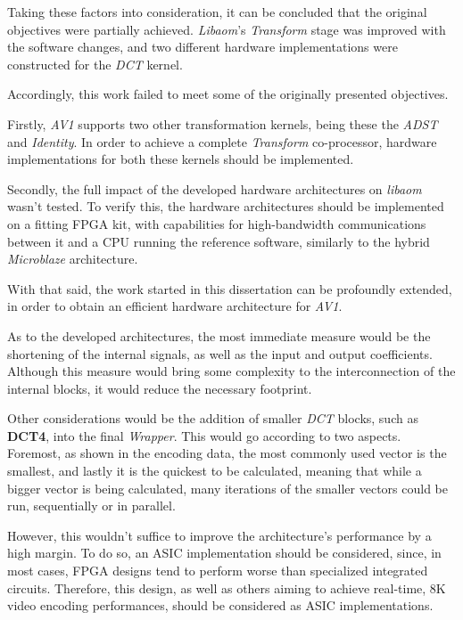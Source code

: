 Taking these factors into consideration, it can be concluded that the original objectives were partially achieved. \emph{Libaom}'s \emph{Transform} stage was improved with the software changes, and two different hardware implementations were constructed for the \emph{DCT} kernel. 

Accordingly, this work failed to meet some of the originally presented objectives.

Firstly, \emph{AV1} supports two other transformation kernels, being these the \emph{ADST} and \emph{Identity}. In order to achieve a complete \emph{Transform} co-processor, hardware implementations for both these kernels should be implemented.

Secondly, the full impact of the developed hardware architectures on \emph{libaom} wasn't tested. To verify this, the hardware architectures should be implemented on a fitting FPGA kit, with capabilities for high-bandwidth communications between it and a CPU running the reference software, similarly to the hybrid \emph{Microblaze} architecture.

With that said, the work started in this dissertation can be profoundly extended, in order to obtain an efficient hardware architecture for \emph{AV1}.

As to the developed architectures, the most immediate measure would be the shortening of the internal signals, as well as the input and output coefficients. Although this measure would bring some complexity to the interconnection of the internal blocks, it would reduce the necessary footprint.

Other considerations would be the addition of smaller \emph{DCT} blocks, such as \textbf{DCT4}, into the final \emph{Wrapper}. This would go according to two aspects. Foremost, as shown in the encoding data, the most commonly used vector is the smallest, and lastly it is the quickest to be calculated, meaning that while a bigger vector is being calculated, many iterations of the smaller vectors could be run, sequentially or in parallel.

However, this wouldn't suffice to improve the architecture's performance by a high margin. To do so, an ASIC implementation should be considered, since, in most cases, FPGA designs tend to perform worse than specialized integrated circuits. Therefore, this design, as well as others aiming to achieve real-time, 8K video encoding performances, should be considered as ASIC implementations.



\clearpage
\printbibliography[heading=subbibliography]
